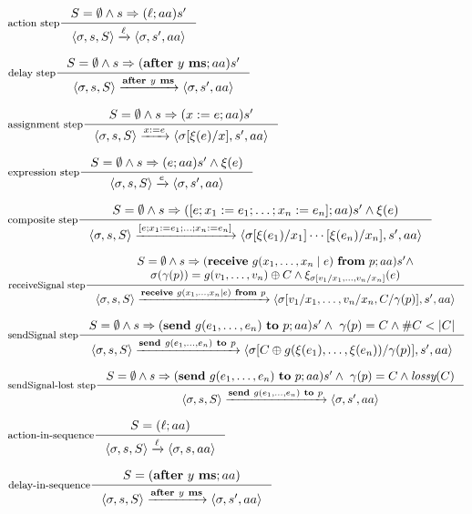 \documentclass[parskip]{scrartcl}
\newcommand{\step}[1]{\xrightarrow{#1}}
\newcommand{\lossy}{\textit{lossy}}
\theoremstyle{definition}
\begin{document}
$\inference[action step]{S = \emptyset \wedge s \Rightarrow(\ell; aa) s'}{\langle \sigma, s, S\rangle \step{\ell} \langle \sigma, s', aa\rangle}$

$\inference[delay step]{S = \emptyset \wedge s \Rightarrow(\textbf{after}\ y\ \textbf{ms}; aa) s'}{\langle \sigma, s, S\rangle \step{\textbf{after}\ y\ \textbf{ms}} \langle \sigma, s', aa\rangle}$

$\inference[assignment step]{S = \emptyset \wedge s \Rightarrow(x:=e; aa) s'}{\langle \sigma, s, S \rangle \step{x:=e} \langle \sigma[\xi(e) / x], s', aa \rangle}$

$\inference[expression step]{S = \emptyset \wedge s \Rightarrow(e;aa) s' \wedge \xi(e)}{\langle \sigma, s, S\rangle \step{e} \langle \sigma, s', aa \rangle}$

$\inference[composite step]{S = \emptyset \wedge s \Rightarrow([e;x_1:=e_1;\ldots ; x_n:=e_n];aa) s' \wedge \xi(e)}{\langle \sigma, s, S\rangle \step{[e;x_1:=e_1;\ldots ; x_n:=e_n]} \langle \sigma[\xi(e_1)/x_1] \cdots [\xi(e_n)/x_n], s', aa\rangle }$

$\inference[receiveSignal step]{S = \emptyset \wedge s \Rightarrow (\textbf{receive}\ g(x_1,\ldots,x_n \mid e)\ \textbf{from}\ p;aa) s' \wedge\\ \sigma(\gamma(p)) = g(v_1,\ldots, v_n) \oplus C \wedge \xi_{\sigma[v_1/x_1,\ldots,v_n/x_n]}(e)}{\langle \sigma, s, S\rangle \step{\textbf{receive}\ g(x_1,\ldots,x_n \mid e)\ \textbf{from}\ p} \langle \sigma[v_1/x_1,\ldots,v_n/x_n,C/\gamma(p)],s',aa\rangle}$

$\inference[sendSignal step]{S = \emptyset \wedge s \Rightarrow (\textbf{send}\ g(e_1,\ldots,e_n)\ \textbf{to}\ p;aa) s' \wedge\ \gamma(p) = C \wedge \#C < |C|}{\langle \sigma, s, S\rangle \step{\textbf{send}\ g(e_1,\ldots,e_n)\ \textbf{to}\ p} \langle \sigma[C \oplus g(\xi(e_1),\ldots,\xi(e_n))/\gamma(p)],s',aa\rangle}$

$\inference[sendSignal-lost step]{S = \emptyset \wedge s \Rightarrow (\textbf{send}\ g(e_1,\ldots,e_n)\ \textbf{to}\ p;aa) s' \wedge\ \gamma(p) = C \wedge \lossy(C)}{\langle \sigma, s, S\rangle \step{\textbf{send}\ g(e_1,\ldots,e_n)\ \textbf{to}\ p} \langle \sigma,s',aa\rangle}$

$\inference[action-in-sequence]{S = (\ell;aa)}{\langle \sigma, s, S \rangle \step{\ell} \langle \sigma, s, aa \rangle}$

$\inference[delay-in-sequence]{S = (\textbf{after}\ y\ \textbf{ms}; aa)}{\langle \sigma, s, S\rangle \step{\textbf{after}\ y\ \textbf{ms}} \langle \sigma, s', aa\rangle}$
\end{document}
